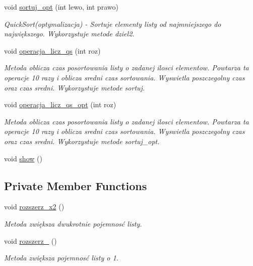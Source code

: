 \begin{DoxyCompactItemize}
void \hyperlink{classarr_1_1_lista_a5dc55514faad46b0a2998bfe4b9e075c}{sortuj\-\_\-opt} (int lewo, int prawo)
\begin{DoxyCompactList}\small\item\em Quick\-Sort(optymalizacja) -\/ Sortuje elementy listy od najmniejszego do największego. Wykorzystuje metode dziel2. \end{DoxyCompactList}\item 
void \hyperlink{classarr_1_1_lista_a1de7c0e896407e0237718e30cabd5e25}{operacja\-\_\-licz\-\_\-qs} (int roz)
\begin{DoxyCompactList}\small\item\em Metoda oblicza czas posortowania listy o zadanej ilosci elementow. Powtarza ta operacje 10 razy i oblicza sredni czas sortowania. Wyswietla poszczegolny czas oraz czas sredni. Wykorzystuje metode sortuj. \end{DoxyCompactList}\item 
void \hyperlink{classarr_1_1_lista_a1ca9dc2b1e97879dd54e322e03bae9ec}{operacja\-\_\-licz\-\_\-qs\-\_\-opt} (int roz)
\begin{DoxyCompactList}\small\item\em Metoda oblicza czas posortowania listy o zadanej ilosci elementow. Powtarza ta operacje 10 razy i oblicza sredni czas sortowania. Wyswietla poszczegolny czas oraz czas sredni. Wykorzystuje metode sortuj\-\_\-opt. \end{DoxyCompactList}\item 
void \hyperlink{classarr_1_1_lista_a7995f1dfb1b2b1dc430498f20c6bcc7d}{show} ()
\end{DoxyCompactItemize}
\subsection*{Private Member Functions}
\begin{DoxyCompactItemize}
\item 
void \hyperlink{classarr_1_1_lista_ac4f01715efe075f780e006d757ed0c26}{rozszerz\-\_\-x2} ()
\begin{DoxyCompactList}\small\item\em Metoda zwiększa dwukrotnie pojemnosć listy. \end{DoxyCompactList}\item 
void \hyperlink{classarr_1_1_lista_ad6bf8061555507002920efbe6f3c0bb1}{rozszerz\-\_} ()
\begin{DoxyCompactList}\small\item\em Metoda zwiększa pojemnosć listy o 1. \end{DoxyCompactList}\end{DoxyCompactItemize}
